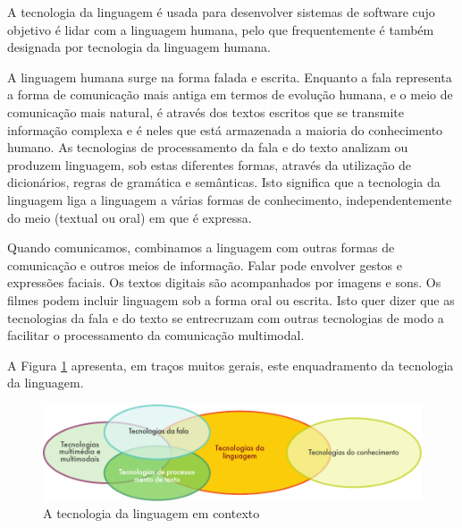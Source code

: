 \clearpage



\begin{multicols}{2}

 A tecnologia da linguagem é usada para desenvolver sistemas de software cujo objetivo é lidar com a linguagem humana, pelo que frequentemente é também designada por tecnologia da linguagem humana. 

A linguagem humana surge na forma falada e escrita. Enquanto a fala representa a forma de comunicação mais antiga em termos de evolução humana, e o meio de comunicação mais natural, é através dos textos escritos que se transmite informação complexa e é neles que está armazenada a maioria do conhecimento humano. As tecnologias de processamento da fala e do texto analizam ou produzem linguagem, sob estas diferentes formas, através
da utilização de dicionários, regras de gramática e semânticas. Isto significa que a tecnologia da linguagem liga a linguagem a várias formas de conhecimento, independentemente do meio (textual ou oral) em que é expressa. 

Quando comunicamos, combinamos a linguagem com outras formas de comunicação e outros meios de informação. 
Falar pode envolver gestos e expressões faciais. Os textos digitais são acompanhados por imagens e sons. 
Os filmes podem incluir linguagem sob a forma oral ou escrita. Isto quer dizer que as tecnologias da fala e do texto 
se entrecruzam com outras tecnologias de modo a facilitar o processamento da comunicação multimodal.

A Figura \ref{fig:ltincontext_de} apresenta, em traços muitos gerais, este enquadramento da tecnologia da linguagem.

\begin{figure}[htb]
  \center
  \includegraphics[width=\textwidth]{../_media/portuguese/language_technologies}
  \caption{A tecnologia da linguagem em contexto}
  \label{fig:ltincontext_de}
\end{figure}


\end{multicols}
